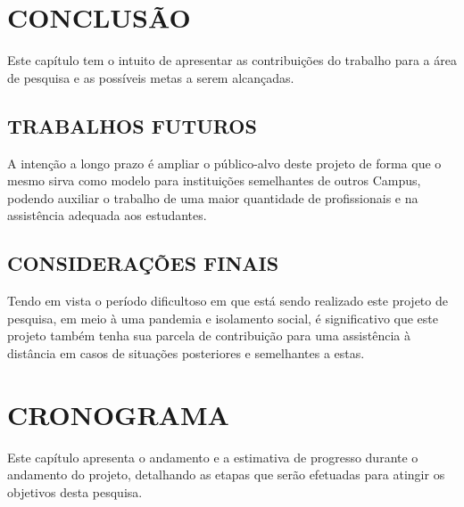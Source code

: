 
\chapter{CONCLUSÃO}
\label{chap:conclusao}

Este capítulo tem o intuito de apresentar as contribuições do trabalho para a área de pesquisa e as possíveis metas a serem alcançadas.

\section{TRABALHOS FUTUROS}
\label{sec:trabalhosFuturos}

A intenção a longo prazo é ampliar o público-alvo deste projeto de forma que o mesmo sirva como modelo para instituições semelhantes de outros Campus, podendo auxiliar o trabalho de uma maior quantidade de profissionais e na assistência adequada aos estudantes. 

\section{CONSIDERAÇÕES FINAIS}
\label{sec:consideracoesFinais}
Tendo em vista o período dificultoso em que está sendo realizado este projeto de pesquisa, em meio à uma pandemia e isolamento social, é significativo que este projeto também tenha sua parcela de contribuição para uma assistência à distância em casos de situações posteriores e semelhantes a estas. 


\chapter{CRONOGRAMA}
\label{chap:cronograma}

Este capítulo apresenta o andamento e a estimativa de progresso durante o andamento do projeto, detalhando as etapas que serão efetuadas para atingir os objetivos desta pesquisa.

